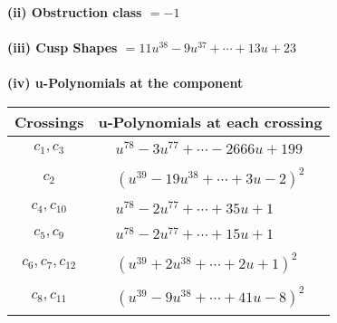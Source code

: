 \documentclass[1p]{elsarticle_modified}
\theoremstyle{definition}
\begin{document}
\flushleft \textbf{(ii) Obstruction class $= -1$}\\~\\
\flushleft \textbf{(iii) Cusp Shapes $= 11 u^{38}-9 u^{37}+\cdots+13 u+23$}\\~\\
\newpage\renewcommand{\arraystretch}{1}
\flushleft \textbf{(iv) u-Polynomials at the component}\newline \\
\begin{tabular}{m{50pt}|m{274pt}}
Crossings & \hspace{64pt}u-Polynomials at each crossing \\
\hline $$\begin{aligned}c_{1},c_{3}\end{aligned}$$&$\begin{aligned}
&u^{78}-3 u^{77}+\cdots-2666 u+199
\end{aligned}$\\
\hline $$\begin{aligned}c_{2}\end{aligned}$$&$\begin{aligned}
&(u^{39}-19 u^{38}+\cdots+3 u-2)^{2}
\end{aligned}$\\
\hline $$\begin{aligned}c_{4},c_{10}\end{aligned}$$&$\begin{aligned}
&u^{78}-2 u^{77}+\cdots+35 u+1
\end{aligned}$\\
\hline $$\begin{aligned}c_{5},c_{9}\end{aligned}$$&$\begin{aligned}
&u^{78}-2 u^{77}+\cdots+15 u+1
\end{aligned}$\\
\hline $$\begin{aligned}c_{6},c_{7},c_{12}\end{aligned}$$&$\begin{aligned}
&(u^{39}+2 u^{38}+\cdots+2 u+1)^{2}
\end{aligned}$\\
\hline $$\begin{aligned}c_{8},c_{11}\end{aligned}$$&$\begin{aligned}
&(u^{39}-9 u^{38}+\cdots+41 u-8)^{2}
\end{aligned}$\\
\hline
\end{tabular}\\~\\
\end{document}
